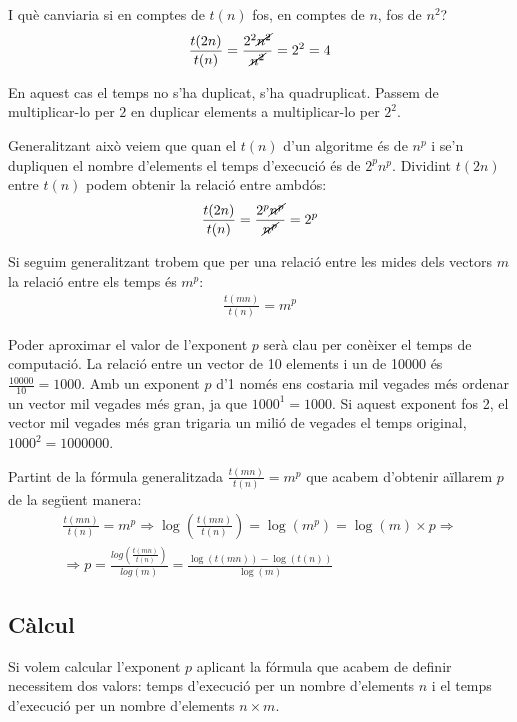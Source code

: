 I què canviaria si en comptes de $t(n)$ fos, en comptes de $n$, fos de $n^2$?
\begin{gather*}
	\frac{t(2n)}{t(n)} = \frac{2^2 \cancel{n^2}}{ \cancel{n^2}} = 2^2 = 4
\end{gather*}

En aquest cas el temps no s'ha duplicat, s'ha quadruplicat. Passem de multiplicar-lo per $2$ en duplicar elements a multiplicar-lo per $2^2$.

Generalitzant això veiem que quan el $t(n)$ d'un algoritme és de $n^p$ i se'n dupliquen el nombre d'elements el temps d'execució és de $2^p n^p$.
Dividint $t(2n)$ entre $t(n)$ podem obtenir la relació entre ambdós:
\begin{gather*}
	\frac{t(2n)}{t(n)} = \frac{2^p \cancel{n^p}}{\cancel{n^p}} = 2^p
\end{gather*}

Si seguim generalitzant trobem que per una relació entre les mides dels vectors $m$ la relació entre els temps és $m^p$:
\begin{gather*}
	\frac{t(mn)}{t(n)} = m^p
\end{gather*}

Poder aproximar el valor de l'exponent $p$ serà clau per conèixer el temps de computació.
La relació entre un vector de 10 elements i un de 10000 és $\frac{10000}{10} = 1000$. Amb un exponent $p$ d'1 només ens costaria mil vegades més ordenar un vector mil vegades més gran, ja que $1000^1 = 1000$.
Si aquest exponent fos 2, el vector mil vegades més gran trigaria un milió de vegades el temps original, $1000^2 = 1000000$.

Partint de la fórmula generalitzada $\frac{t(mn)}{t(n)} = m^p
$ que acabem d'obtenir aïllarem $p$ de la següent manera:
\begin{gather*}
	\frac{t(mn)}{t(n)} = m^p \Rightarrow \log\left(\frac{t(mn)}{t(n)}\right) = \log (m^p) = \log(m) \times p \Rightarrow \\
	\Rightarrow p = \frac{log\left(\frac{t(mn)}{t(n)}\right)}{log(m)} = \frac{\log(t(mn))-\log(t(n))}{\log(m)}
\end{gather*}

\subsection{Càlcul}
Si volem calcular l'exponent $p$ aplicant la fórmula que acabem de definir necessitem dos valors: temps d'execució per un nombre d'elements $n$ i el temps d'execució per un nombre d'elements $n \times m$.

